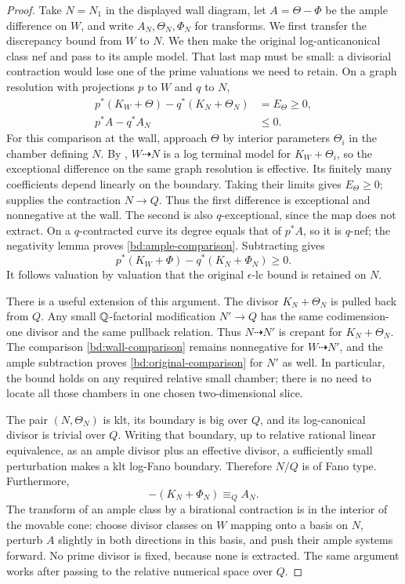 \begin{proof}
Take $N=N_1$ in the displayed wall diagram, let
$A=\Theta-\Phi$ be the ample difference on $W$, and write
$A_N,\Theta_N,\Phi_N$ for transforms. We first transfer the
discrepancy bound from $W$ to $N$. We then make the original
log-anticanonical class nef and pass to its ample model. That last
map must be small: a divisorial contraction would lose one of the
prime valuations we need to retain.
On a graph resolution
with projections $p$ to $W$ and $q$ to $N$,
\begin{align}
 p^*(K_W+\Theta)-q^*(K_N+\Theta_N)&=E_\Theta\geq0,
       \label{bd:wall-comparison}\\
 p^*A-q^*A_N&\leq0.\label{bd:ample-comparison}
\end{align}
For this comparison at the wall, approach $\Theta$ by interior parameters
$\Theta_i$ in the chamber defining $N$.
By \cite[Theorem~3.3(3)]{HM13}, $W\dashrightarrow N$ is a log terminal
model for $K_W+\Theta_i$, so the exceptional difference on the same graph
resolution is effective. Its finitely many coefficients depend linearly
on the boundary. Taking their limits gives $E_\Theta\geq0$;
\cite[Theorem~3.3(2)]{HM13} supplies the contraction $N\to Q$.
Thus the first difference is exceptional and nonnegative at the wall.  The second is also $q$-exceptional,
since the map does not extract.  On a $q$-contracted curve its
degree equals that of $p^*A$, so it is $q$-nef; the negativity
lemma proves \eqref{bd:ample-comparison}.  Subtracting gives
\begin{equation}\label{bd:original-comparison}
 p^*(K_W+\Phi)-q^*(K_N+\Phi_N)\geq0.
\end{equation}
It follows valuation by valuation that the original
$\epsilon$-lc bound is retained on $N$.

There is a useful extension of this argument.  The divisor
$K_N+\Theta_N$ is pulled back from $Q$.  Any small
$\mathbb Q$-factorial modification $N'\to Q$ has the same
codimension-one divisor and the same pullback relation.
Thus $N\dashrightarrow N'$ is crepant for $K_N+\Theta_N$.
The comparison \eqref{bd:wall-comparison} remains nonnegative
for $W\dashrightarrow N'$, and the ample subtraction proves
\eqref{bd:original-comparison} for $N'$ as well.  In particular,
the bound holds on any required relative small chamber; there
is no need to locate all those chambers in one chosen
two-dimensional slice.

The pair $(N,\Theta_N)$ is klt, its boundary is big over $Q$,
and its log-canonical divisor is trivial over $Q$.  Writing
that boundary, up to relative rational linear equivalence, as
an ample divisor plus an effective divisor, a sufficiently
small perturbation makes a klt log-Fano boundary.  Therefore
$N/Q$ is of Fano type.  Furthermore,
\[
                 -(K_N+\Phi_N)\equiv_Q A_N.
\]
The transform of an ample class by a birational contraction is
in the interior of the movable cone: choose divisor classes
on $W$ mapping onto a basis on $N$, perturb $A$ slightly in
both directions in this basis, and push their ample systems
forward.  No prime divisor is fixed, because none is extracted.
The same argument works after passing to the relative numerical
space over $Q$.


\end{proof}
